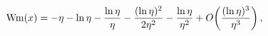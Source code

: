 \[\mathop{\mathrm{Wm}\/}\nolimits\!\left(x\right)=-\eta-\mathop{\ln\/}\nolimits%
\eta-\frac{\mathop{\ln\/}\nolimits\eta}{\eta}-\frac{(\mathop{\ln\/}\nolimits%
\eta)^{2}}{2\eta^{2}}-\frac{\mathop{\ln\/}\nolimits\eta}{\eta^{2}}+\mathop{O\/%
}\nolimits\!\left(\frac{(\mathop{\ln\/}\nolimits\eta)^{3}}{\eta^{3}}\right),\]